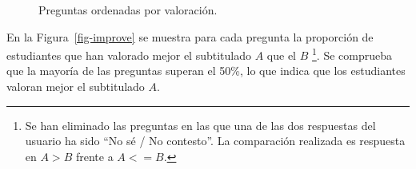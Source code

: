 \documentclass[
  12pt,
  a4paper,
  extrafontsizes,
  onecolumn,
  openright,
  table]{memoir}
\begin{document}
\begin{figure}

\begin{minipage}[t]{0.50\linewidth}

{\centering 


}

\end{minipage}%
%
\begin{minipage}[t]{0.50\linewidth}

{\centering 


}

\end{minipage}%
\newline
\begin{minipage}[t]{0.50\linewidth}

{\centering 


}

\end{minipage}%
%
\begin{minipage}[t]{0.50\linewidth}

{\centering 


}

\end{minipage}%

\caption{\label{fig-likert}Preguntas ordenadas por valoración.}

\end{figure}

En la Figura~\ref{fig-improve} se muestra para cada pregunta la
proporción de estudiantes que han valorado mejor el subtitulado \(A\)
que el \(B\) \footnote{Se han eliminado las preguntas en las que una de
  las dos respuestas del usuario ha sido \enquote{No sé / No contesto}.
  La comparación realizada es respuesta en \(A > B\) frente a
  \(A <= B\).}. Se comprueba que la mayoría de las preguntas superan el
50\%, lo que indica que los estudiantes valoran mejor el subtitulado
\(A\).
\end{document}
